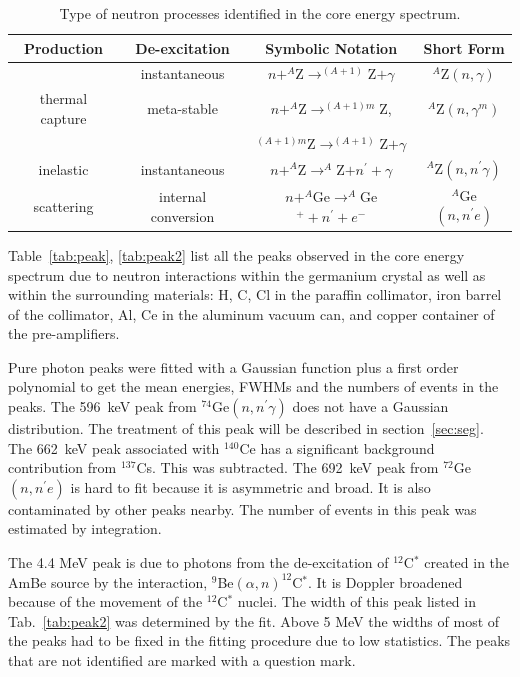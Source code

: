 \documentclass{elsart}
\begin{document}
\begin{table}[tbhp] 
  \caption{Type of neutron processes identified in the core energy spectrum.}
  \label{tab:type}
  \begin{tabular*}{\textwidth}{@{\extracolsep{\fill}}c|c|c|c}\hline\hline
    Production & De-excitation & Symbolic Notation & Short Form \\\hline
    & instantaneous & $n + ^A$Z$ \rightarrow ^{(A+1)}$Z$ + \gamma$ & $^A$Z$(n,\gamma)$\\\cline{2-4}
    thermal capture & meta-stable & $n + ^A$Z$ \rightarrow ^{(A+1)m}$Z, & $^A$Z$(n,\gamma^{m})$\\
    & & $^{(A+1)m}$Z$ \rightarrow ^{(A+1)}$Z$+\gamma$ &  \\\hline
    inelastic & instantaneous & 
    $n + ^A$Z$ \rightarrow ^A$Z$ + n^\prime + \gamma$ & $^A$Z$(n,n^\prime\gamma)$\\\cline{2-4}
    scattering & internal conversion & 
    $n + ^A$Ge$ \rightarrow ^A$Ge$^{+} + n^\prime + e^-$ & $^A$Ge$(n,n^\prime e)$\\\hline\hline
  \end{tabular*}
\end{table}

Table~\ref{tab:peak}, \ref{tab:peak2} list all the peaks observed in
the core energy spectrum due to neutron interactions within the
germanium crystal as well as within the surrounding materials: H, C,
Cl in the paraffin collimator, iron barrel of the collimator, Al, Ce
in the aluminum vacuum can, and copper container of the
pre-amplifiers.

Pure photon peaks were fitted with a Gaussian function plus a first
order polynomial to get the mean energies, FWHMs and the numbers of
events in the peaks. The 596~keV peak from $^{74}$Ge$(n, n^\prime
\gamma)$ does not have a Gaussian distribution. The treatment of this
peak will be described in section~\ref{sec:seg}. The 662~keV peak
associated with $^{140}$Ce has a significant background contribution
from $^{137}$Cs. This was subtracted. The 692~keV peak from
$^{72}$Ge$(n,n^\prime e)$ is hard to fit because it is asymmetric and
broad. It is also contaminated by other peaks nearby. The number of
events in this peak was estimated by integration.

The 4.4 MeV peak is due to photons from the de-excitation of
$^{12}$C$^{*}$ created in the AmBe source by the interaction,
$^{9}$Be$(\alpha,n)^{12}$C$^{*}$. It is Doppler broadened because of
the movement of the $^{12}$C$^{*}$ nuclei. The width of this peak
listed in Tab.~\ref{tab:peak2} was determined by the fit. Above 5 MeV
the widths of most of the peaks had to be fixed in the fitting
procedure due to low statistics. The peaks that are not identified are
marked with a question mark.
\end{document}

